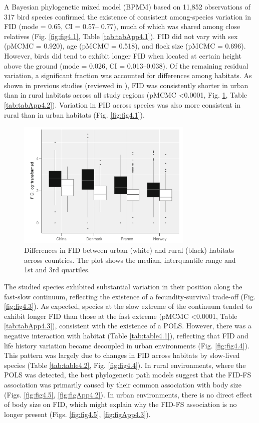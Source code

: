 A Bayesian phylogenetic mixed model (BPMM) based on 11,852
observations of 317 bird species confirmed the existence of consistent
among-species variation in FID (mode = 0.65, CI = 0.57–
0.77), much of which was shared among close relatives (Fig. \ref{fig:fig4.1},
Table \ref{tab:tabApp4.1}). FID did not vary with sex (pMCMC = 0.920), age
(pMCMC = 0.518), and flock size (pMCMC = 0.696). However,
birds did tend to exhibit longer FID when located at certain height
above the ground (mode = 0.026, CI = 0.013–0.038). Of the remaining
residual variation, a significant fraction was accounted for
differences among habitats. As shown in previous studies
(reviewed in \citet{Moller2014a}), FID was consistently shorter in urban
than in rural habitats across all study regions (pMCMC \textless{0.0001},
Fig. \ref{fig:fig4.2}, Table \ref{tab:tabApp4.2}). Variation in FID across species was also more
consistent in rural than in urban habitats (Fig. \ref{fig:fig4.1}).

\begin{figure}
\centering
\includegraphics[width=0.75\textwidth]{./Figures/chapter04/Fig_2.png}
\caption[FID across countries]{Differences in FID between urban (white) and rural
(black) habitats across countries. The plot shows the median,
interquantile range and 1st and 3rd quartiles.}\label{fig:fig4.2}
\end{figure}

The studied species exhibited substantial variation in their
position along the fast-slow continuum, reflecting the existence
of a fecundity-survival trade-off (Fig. \ref{fig:fig4.3}). As expected, species at
the slow extreme of the continuum tended to exhibit longer FID
than those at the fast extreme (pMCMC \textless{0.0001}, Table \ref{tab:tabApp4.3}),
consistent with the existence of a POLS. However, there was a
negative interaction with habitat (Table \ref{tab:table4.1}), reflecting that FID
and life history variation became decoupled in urban environments
(Fig. \ref{fig:fig4.4}). This pattern was largely due to changes in FID
across habitats by slow-lived species (Table \ref{tab:table4.2}, Fig. \ref{fig:fig4.4}). In rural
environments, where the POLS was detected, the best phylogenetic
path models suggest that the FID-FS association was primarily
caused by their common association with body size
(Figs. \ref{fig:fig4.5}, \ref{fig:figApp4.2}). In urban environments, there is no direct effect of
body size on FID, which might explain why the FID-FS association 
is no longer present (Figs. \ref{fig:fig4.5}, \ref{fig:figApp4.3}).

